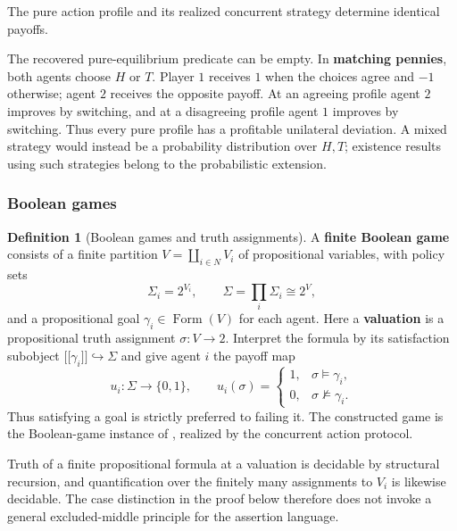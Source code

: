\documentclass[11pt,a4paper]{article}
\numberwithin{equation}{section}
\theoremstyle{definition}
\newtheorem{definition}[theorem]{Definition}
\theoremstyle{remark}
\theoremstyle{plain}
\providecommand{\llbracket}{\mathopen{[\![}}
\providecommand{\rrbracket}{\mathclose{]\!]}}
\begin{document}
\noindent The pure action profile and its realized concurrent strategy determine identical payoffs.
\begin{center}
\end{center}

The recovered pure-equilibrium predicate can be empty.
In \textbf{matching pennies}, both agents choose $H$ or $T$. Player $1$
receives $1$ when the choices agree and $-1$ otherwise; agent $2$ receives
the opposite payoff. At an agreeing profile agent $2$ improves by switching,
and at a disagreeing profile agent $1$ improves by switching.
Thus every pure profile has a profitable unilateral deviation.
A mixed strategy would instead be a probability distribution over $H,T$;
existence results using such strategies belong to the probabilistic
extension.

\subsubsection{Boolean games}

\begin{definition}[Boolean games and truth assignments]
\label{def:egt-boolean-games-and-truth-assignments}
A \textbf{finite Boolean game} consists of a finite partition
$V=\coprod_{i\in N}V_i$ of propositional variables, with policy sets
\[
 \Sigma_i=2^{V_i},\qquad
 \Sigma=\prod_i\Sigma_i\cong 2^V,
\]
and a propositional goal $\gamma_i\in\operatorname{Form}(V)$ for each
agent. Here a \textbf{valuation} is a propositional truth assignment $\sigma:V\to2$. Interpret the
formula by its satisfaction subobject
$\llbracket\gamma_i\rrbracket\hookrightarrow\Sigma$ and give
agent $i$ the payoff map
\[
 u_i:\Sigma\longrightarrow\{0,1\},\qquad
 u_i(\sigma)=
 \begin{cases}1,&\sigma\models\gamma_i,\\
               0,&\sigma\not\models\gamma_i.
 \end{cases}
\]
Thus satisfying a goal is strictly preferred to failing it. The
constructed game is the Boolean-game instance of
\citet{BonzonEtAl2006}, realized by the concurrent action protocol.
\end{definition}
Truth of a finite propositional formula at a valuation is decidable by
structural recursion, and quantification over the finitely many assignments
to $V_i$ is likewise decidable. The case distinction in the proof below
therefore does not invoke a general excluded-middle principle for the
assertion language.
\end{document}
